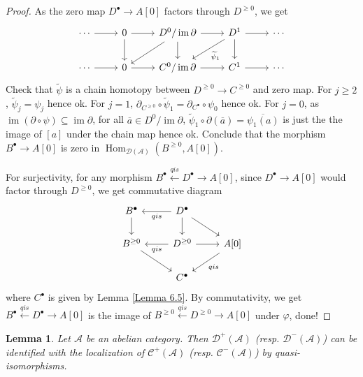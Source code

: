 \documentclass{ctexart}
\newtheorem{lemma}{Lemma}[section]
\renewcommand{\hom}{\operatorname{Hom}}
\newcommand{\im}{\operatorname{im}}
\begin{document}
\begin{proof}
    As the zero map $D^{\bullet} \rightarrow A[0]$ factors through $D^{\ge 0}$,
    we get
    \begin{equation}
        \begin{tikzcd}
            \cdots \arrow[r] & 
            0 \arrow[r] \arrow[d] &
            D^{0}/ \im \partial \arrow[r] \arrow[d] \arrow[dl] &
            D^{1} \arrow[r] \arrow[d] \arrow[dl, "\widetilde{\psi}_{1}"] &
            \cdots \\
            \cdots \arrow[r] &
            0 \arrow[r] &
            C^{0}/\im \partial \arrow[r] &
            C^{1} \arrow[r] &
            \cdots
        \end{tikzcd}
    \end{equation}
    Check that $\widetilde{\psi}$ is a chain homotopy between $D^{\ge 0} \rightarrow C^{\ge 0}$ and zero map.
    For $j \ge 2$, $\widetilde{\psi}_{j} = \psi_{j}$ hence ok.
    For $j = 1$, $\partial_{C^{\ge 0}} \circ \widetilde{\psi}_{1} = \partial_{C^{\bullet}} \circ \psi_{0}$ hence ok.
    For $j = 0$, as $\im (\partial \circ \psi) \subseteq \im \partial$, 
    for all $\overline{a}\in D^{0}/\im \partial$, $\widetilde{\psi}_{1} \circ \partial(\overline{a}) = \overline{\psi_{1}(a)}$ is just the the image of $[a]$ under the chain map hence ok.
    Conclude that the morphism $B^{\bullet} \rightarrow A[0]$ is zero in $\hom_{\mathcal{D}(\mathscr{A})}(B^{\ge 0}, A[0])$.
    \par
    For surjectivity, for any morphism $B^{\bullet} \overset{qis}{\leftarrow} D^{\bullet} \rightarrow A[0]$,
    since $D^{\bullet} \rightarrow A[0]$ would factor through $D^{\ge 0}$, we get commutative diagram
    \begin{equation}
        \begin{tikzcd}
            B^{\bullet} \arrow[d] &
            D^{\bullet} \arrow[dr] \arrow[d] \arrow[l, "qis"] & \\
            B^{\ge 0} \arrow[dr] &
            D^{\ge 0} \arrow[r] \arrow[l, "qis"] &
            A[0] \arrow[dl, "qis"] \\
            & C^{\bullet} &
        \end{tikzcd}
    \end{equation}
    where $C^{\bullet}$ is given by Lemma \ref{Lemma 6.5}.
    By commutativity, we get $B^{\bullet} \overset{qis}{\leftarrow} D^{\bullet} \rightarrow A[0]$ is the image of $B^{\ge 0} \overset{qis}{\leftarrow} D^{\ge 0} \rightarrow A[0]$ under $\varphi$, done!
\end{proof}
\begin{lemma}
    Let $\mathscr{A}$ be an abelian category.
    Then $\mathcal{D}^{+}(\mathscr{A})$ (resp. $\mathcal{D}^{-}(\mathscr{A})$) can be identified with the localization of $\mathcal{C}^{+}(\mathscr{A})$ (resp. $\mathcal{C}^{-}(\mathscr{A})$) by quasi-isomorphisms.
    \label{Lemma 6.8}
\end{lemma}
\end{document}
